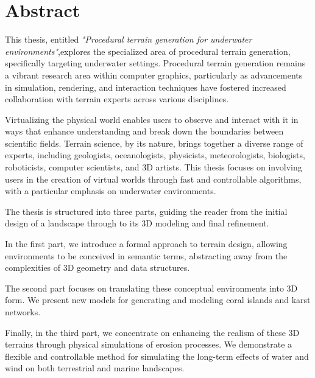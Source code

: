 \clearpage
\pagebreak

\section*{Abstract}

This thesis, entitled \textit{"Procedural terrain generation for underwater environments"},explores the specialized area of procedural terrain generation, specifically targeting underwater settings. Procedural terrain generation remains a vibrant research area within computer graphics, particularly as advancements in simulation, rendering, and interaction techniques have fostered increased collaboration with terrain experts across various disciplines.

Virtualizing the physical world enables users to observe and interact with it in ways that enhance understanding and break down the boundaries between scientific fields. Terrain science, by its nature, brings together a diverse range of experts, including geologists, oceanologists, physicists, meteorologists, biologists, roboticists, computer scientists, and 3D artists. This thesis focuses on involving users in the creation of virtual worlds through fast and controllable algorithms, with a particular emphasis on underwater environments.

The thesis is structured into three parts, guiding the reader from the initial design of a landscape through to its 3D modeling and final refinement.

In the first part, we introduce a formal approach to terrain design, allowing environments to be conceived in semantic terms, abstracting away from the complexities of 3D geometry and data structures.

The second part focuses on translating these conceptual environments into 3D form. We present new models for generating and modeling coral islands and karst networks.

Finally, in the third part, we concentrate on enhancing the realism of these 3D terrains through physical simulations of erosion processes. We demonstrate a flexible and controllable method for simulating the long-term effects of water and wind on both terrestrial and marine landscapes.







